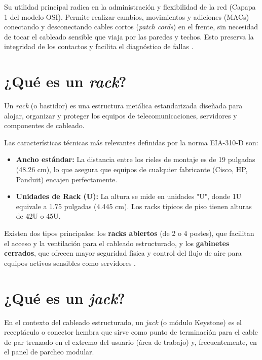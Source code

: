 \documentclass[a4paper,12pt]{article}
\begin{document}
Su utilidad principal radica en la administración y flexibilidad de la red (Capapa 1 del modelo OSI). Permite realizar cambios, movimientos y adiciones (MACs) conectando y desconectando cables cortos (\textit{patch cords}) en el frente, sin necesidad de tocar el cableado sensible que viaja por las paredes y techos. Esto preserva la integridad de los contactos y facilita el diagnóstico de fallas \cite{sysracks_patch}.

\section{¿Qué es un \textit{rack}?}

Un \textit{rack} (o bastidor) es una estructura metálica estandarizada diseñada para alojar, organizar y proteger los equipos de telecomunicaciones, servidores y componentes de cableado.

Las características técnicas más relevantes definidas por la norma EIA-310-D son:
\begin{itemize}
    \item \textbf{Ancho estándar:} La distancia entre los rieles de montaje es de 19 pulgadas (48.26 cm), lo que asegura que equipos de cualquier fabricante (Cisco, HP, Panduit) encajen perfectamente.
    \item \textbf{Unidades de Rack (U):} La altura se mide en unidades "U", donde 1U equivale a 1.75 pulgadas (4.445 cm). Los racks típicos de piso tienen alturas de 42U o 45U.
\end{itemize}

Existen dos tipos principales: los \textbf{racks abiertos} (de 2 o 4 postes), que facilitan el acceso y la ventilación para el cableado estructurado, y los \textbf{gabinetes cerrados}, que ofrecen mayor seguridad física y control del flujo de aire para equipos activos sensibles como servidores \cite{mercadolibre}.

\section{¿Qué es un \textit{jack}?}

En el contexto del cableado estructurado, un \textit{jack} (o módulo Keystone) es el receptáculo o conector hembra que sirve como punto de terminación para el cable de par trenzado en el extremo del usuario (área de trabajo) y, frecuentemente, en el panel de parcheo modular.
\end{document}

